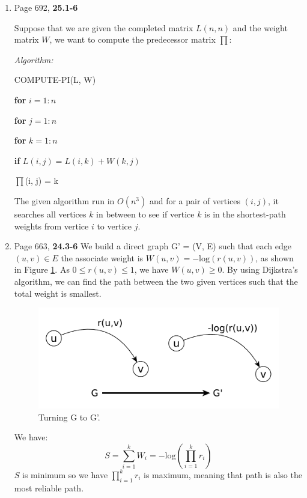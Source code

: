 \documentclass[11pts]{report}
\begin{document}
\begin{enumerate}
\item Page 692, \textbf{25.1-6}
\par Suppose that we are given the completed matrix $L(n,n)$ and the weight matrix $W$, we want to compute the predecessor matrix $\prod$:
\par \textit{Algorithm:}
\par COMPUTE-PI(L, W)
\par \textbf{for} $i = 1:n$
\par \quad \textbf{for} $j = 1:n$
\par \qquad \textbf{for} $k = 1:n$
\par \qquad \quad \textbf{if} $L(i, j) = L(i, k) + W(k, j)$
\par \qquad \qquad $\prod$(i, j) = k
\par The given algorithm run in $O(n^3)$ and for a pair of vertices $(i,j)$, it searches all vertices $k$ in between to see if vertice $k$ is in the shortest-path weights from vertice $i$ to vertice $j$.
\item Page 663, \textbf{24.3-6}
We build a direct graph G' = (V, E) such that each edge $(u, v) \in E$ the associate weight is $W(u,v) = -\text{log}(r(u,v))$, as shown in Figure \ref{Fig:6}. As $0 \leq r(u,v) \leq 1$, we have $W(u,v) \geq 0$. By using Dijkstra's algorithm, we can find the path between the two given vertices such that the total weight is smallest.

\begin{figure}[htbp]
\begin{center}
\includegraphics[scale=0.5]{6.pdf}
\caption{Turning G to G'.}
\label{Fig:6}
\end{center}
\end{figure}

We have:
\begin{equation*}
S = \sum_{i=1}^k W_i = -\text{log}(\prod_{i=1}^k r_i)
\end{equation*}
$S$ is minimum so we have $\prod_{i=1}^k r_i$ is maximum, meaning that path is also the most reliable path.
\end{enumerate}
\end{document}
